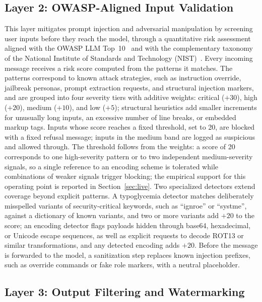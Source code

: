 \subsection{Layer 2: OWASP-Aligned Input Validation}
\label{sec:layer2}

This layer mitigates prompt injection and adversarial manipulation by screening user inputs before they reach the model, through a quantitative risk assessment aligned with the OWASP LLM Top~10~\cite{owasp2025} and with the complementary taxonomy of the National Institute of Standards and Technology (NIST)~\cite{nist2025aml,promptinjection2026}. Every incoming message receives a risk score computed from the patterns it matches. The patterns correspond to known attack strategies, such as instruction override, jailbreak personas, prompt extraction requests, and structural injection markers, and are grouped into four severity tiers with additive weights: critical ($+30$), high ($+20$), medium ($+10$), and low ($+5$); structural heuristics add smaller increments for unusually long inputs, an excessive number of line breaks, or embedded markup tags. Inputs whose score reaches a fixed threshold, set to 20, are blocked with a fixed refusal message; inputs in the medium band are logged as suspicious and allowed through. The threshold follows from the weights: a score of 20 corresponds to one high-severity pattern or to two independent medium-severity signals, so a single reference to an encoding scheme is tolerated while combinations of weaker signals trigger blocking; the empirical support for this operating point is reported in Section~\ref{sec:live}. Two specialized detectors extend coverage beyond explicit patterns. A typoglycemia detector matches deliberately misspelled variants of security-critical keywords, such as ``ignroe'' or ``systme'', against a dictionary of known variants, and two or more variants add $+20$ to the score; an encoding detector flags payloads hidden through base64, hexadecimal, or Unicode escape sequences, as well as explicit requests to decode ROT13 or similar transformations, and any detected encoding adds $+20$. Before the message is forwarded to the model, a sanitization step replaces known injection prefixes, such as override commands or fake role markers, with a neutral placeholder.

\subsection{Layer 3: Output Filtering and Watermarking}
\label{sec:layer3}

